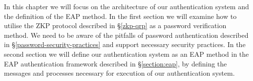 \noindent 
In this chapter we will focus on the architecture of our authentication system and the definition of the EAP method.
In the first section we will examine how to utilise the ZKP protocol described in \S\ref{zkp-qrp} as a password verification method.
We need to be aware of the pitfalls 	of password authentication described in \S\ref{password-security-practices} and support necessary security practices.
In the second section we will define our authentication system as an EAP method in the EAP authentication framework described in \S\ref{section:eap}, by defining the messages and processes necessary for execution of our authentication system.
